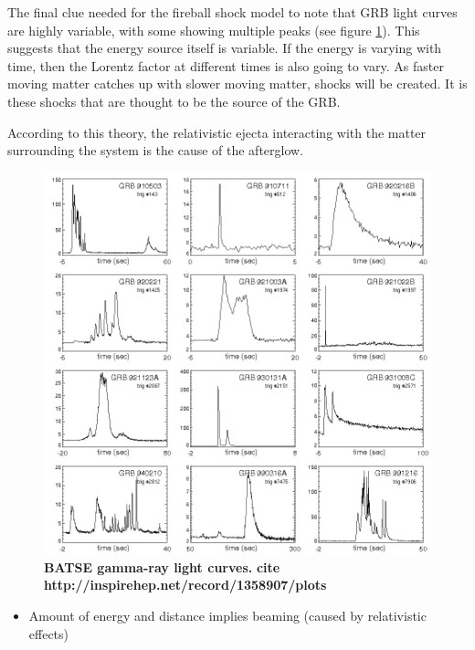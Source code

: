 \documentclass[11pt]{cuthesis}
\begin{document}
The final clue needed for the fireball shock model to note that GRB light curves are highly variable, with some showing multiple peaks (see figure \ref{fig:grb lightcurves}). This suggests that the energy source itself is variable. If the energy is varying with time, then the Lorentz factor at different times is also going to vary. As faster moving matter catches up with slower moving matter, shocks will be created. It is these shocks that are thought to be the source of the GRB. 

According to this theory, the relativistic ejecta interacting with the matter surrounding the system is the cause of the afterglow.

\begin{figure} %
\begin{center}
\includegraphics[width=1.0\linewidth]{grb_lightcurves.png}
\end{center}
\caption{\textbf{BATSE gamma-ray light curves.}  \textbf{cite http://inspirehep.net/record/1358907/plots} }
\label{fig:grb lightcurves}
\end{figure}

\begin{itemize}
\item Amount of energy and distance implies beaming (caused by relativistic effects)
\end{itemize}
\end{document}
